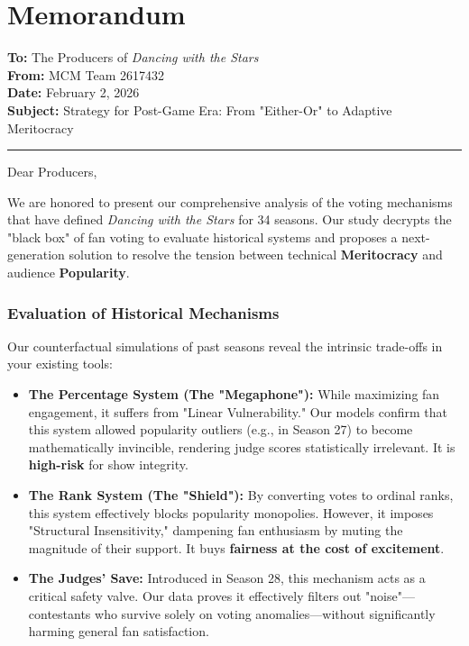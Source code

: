 \section{Memorandum}

\noindent
\textbf{To:} The Producers of \textit{Dancing with the Stars} \\
\textbf{From:} MCM Team 2617432 \\
\textbf{Date:} February 2, 2026 \\
\textbf{Subject:} Strategy for Post-Game Era: From "Either-Or" to Adaptive Meritocracy

\par\noindent\rule{\textwidth}{0.4pt}

\vspace{0.3cm}

\noindent Dear Producers,

We are honored to present our comprehensive analysis of the voting mechanisms that have defined \textit{Dancing with the Stars} for 34 seasons. Our study decrypts the "black box" of fan voting to evaluate historical systems and proposes a next-generation solution to resolve the tension between technical \textbf{Meritocracy} and audience \textbf{Popularity}.

\subsubsection*{Evaluation of Historical Mechanisms}

Our counterfactual simulations of past seasons reveal the intrinsic trade-offs in your existing tools:

\begin{itemize}
    \item \textbf{The Percentage System (The "Megaphone"):} While maximizing fan engagement, it suffers from "Linear Vulnerability." Our models confirm that this system allowed popularity outliers (e.g., in Season 27) to become mathematically invincible, rendering judge scores statistically irrelevant. It is \textbf{high-risk} for show integrity.
    \item \textbf{The Rank System (The "Shield"):} By converting votes to ordinal ranks, this system effectively blocks popularity monopolies. However, it imposes "Structural Insensitivity," dampening fan enthusiasm by muting the magnitude of their support. It buys \textbf{fairness at the cost of excitement}.
    \item \textbf{The Judges' Save:} Introduced in Season 28, this mechanism acts as a critical safety valve. Our data proves it effectively filters out "noise"—contestants who survive solely on voting anomalies—without significantly harming general fan satisfaction.
\end{itemize}

